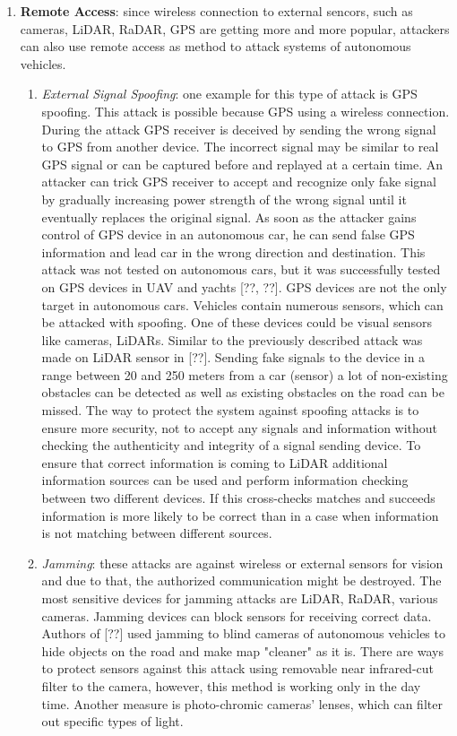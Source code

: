 \begin{itemize}
\begin{enumerate}
\begin{enumerate}
\begin{enumerate}
			\end{enumerate}
		\end{enumerate}
		\item \textbf{Remote Access}: since wireless connection to external sencors, such as cameras, \gls{LiDAR}, \gls{RaDAR}, \gls{GPS} are getting more and more popular, attackers can also use remote access as method to attack systems of autonomous vehicles. 
		\begin{enumerate}
			\item \textit{External Signal Spoofing}: one example for this type of attack is \gls{GPS} spoofing. This attack is possible because \gls{GPS} using a wireless connection. During the attack \gls{GPS} receiver is deceived by sending the wrong signal to \gls{GPS} from another device. The incorrect signal may be similar to real \gls{GPS} signal or can be captured before and replayed at a certain time. An attacker can trick \gls{GPS} receiver to accept and recognize only fake signal by gradually increasing power strength of the wrong signal until it eventually replaces the original signal. As soon as the attacker gains control of \gls{GPS} device in an autonomous car, he can send false \gls{GPS} information and lead car in the wrong direction and destination. This attack was not tested on autonomous cars, but it was successfully tested on \gls{GPS} devices in \gls{UAV} and yachts [??, ??].
			\gls{GPS} devices are not the only target in autonomous cars. Vehicles contain numerous sensors, which can be attacked with spoofing. One of these devices could be visual sensors like cameras, \glspl{LiDAR}. Similar to the previously described attack was made on \gls{LiDAR} sensor in [??]. Sending fake signals to the device in a range between 20 and 250 meters from a car (sensor) a lot of non-existing obstacles can be detected as well as existing obstacles on the road can be missed. 
			The way to protect the system against spoofing attacks is to ensure more security, not to accept any signals and information without checking the authenticity and integrity of a signal sending device. To ensure that correct information is coming to \gls{LiDAR} additional information sources can be used and perform information checking between two different devices. If this cross-checks matches and succeeds information is more likely to be correct than in a case when information is not matching between different sources.
			\item \textit{Jamming}: these attacks are against wireless or external sensors for vision and due to that, the authorized communication might be destroyed. The most sensitive devices for jamming attacks are \gls{LiDAR}, \gls{RaDAR}, various cameras. Jamming devices can block sensors for receiving correct data. Authors of [??] used jamming to blind cameras of autonomous vehicles to hide objects on the road and make map "cleaner" as it is. There are ways to protect sensors against this attack using removable near infrared-cut filter to the camera, however, this method is working only in the day time. Another measure is photo-chromic cameras' lenses, which can filter out specific types of light.

\end{enumerate}
\end{enumerate}
\end{itemize}
